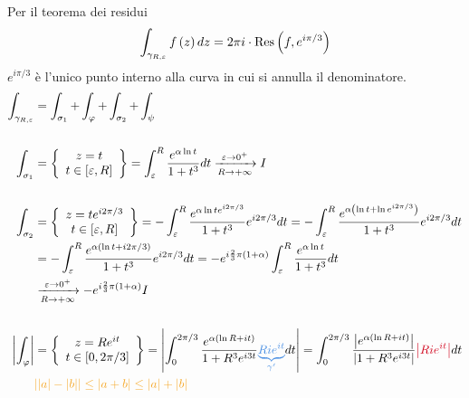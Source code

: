 Per il teorema dei residui
\begin{equation*}
\int _{\gamma _{R,\varepsilon }} f\left(z\right) dz = 2\pi i\cdot \operatorname{Res} \left(f,e^{i\pi /3}\right)
\end{equation*}
$e^{i\pi /3}$ è l'unico punto interno alla curva in cui si annulla il denominatore.
\begin{equation*}
\begin{aligned}
\int _{\gamma _{R,\varepsilon }} & = \int _{\sigma _{1}} + \int _{\varphi } + \int _{\sigma _{2}} + \int _{\psi }\\
 & \\
\int _{\sigma _{1}} & = \left\{
\begin{array}{ c }
z = t\\
t\in [ \varepsilon ,R]
\end{array}\right\} = \int ^{R}_{\varepsilon }\frac{e^{\alpha \ln t}}{1 + t^{3}} dt\xrightarrow[R\rightarrow + \infty ]{\varepsilon \rightarrow 0^{ + }} I\\
 & \\
\int _{\sigma _{2}} & = \left\{
\begin{array}{ c }
z = te^{i2\pi /3}\\
t\in [ \varepsilon ,R]
\end{array}\right\} = - \int ^{R}_{\varepsilon }\frac{e^{\alpha \ln te^{i2\pi /3}}}{1 + t^{3}} e^{i2\pi /3} dt = -\int ^{R}_{\varepsilon }\frac{e^{\alpha \left(\ln t + \ln e^{i2\pi /3}\right)}}{1 + t^{3}} e^{i2\pi /3} dt\\
 & = - \int ^{R}_{\varepsilon }\frac{e^{\alpha (\ln t + i2\pi /3)}}{1 + t^{3}} e^{i2\pi /3} dt = -e^{i\frac{2}{3} \pi (1 + \alpha)}\int ^{R}_{\varepsilon }\frac{e^{\alpha \ln t}}{1 + t^{3}} dt\\
 & \xrightarrow[R\rightarrow + \infty ]{\varepsilon \rightarrow 0^{ + }} - e^{i\frac{2}{3} \pi (1 + \alpha)} I\\
 & \\
\left| \int _{\varphi }\right|  & = \left\{
\begin{array}{ c }
z = Re^{it}\\
t\in [ 0,2\pi /3]
\end{array}\right\} = \left| \int ^{2\pi /3}_{0}\frac{e^{\alpha (\ln R + it)}}{1 + R^{3} e^{i3t}}\textcolor[rgb]{0.29,0.56,0.89}{\underbrace{Rie^{it}}_{\gamma '}} dt\right| = \int ^{2\pi /3}_{0}\frac{\left| e^{\alpha (\ln R + it)}\right| }{\left| 1 + R^{3} e^{i3t}\right| }\textcolor[rgb]{0.82,0.01,0.11}{\left| Rie^{it}\right| } dt\\
 & \textcolor[rgb]{0.96,0.65,0.14}{| | a| - | b| | \leq | a + b| \leq | a| + | b| }\\

\end{aligned}
\end{equation*}
